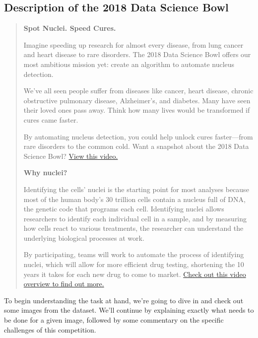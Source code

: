 \documentclass[paper=letter, fontsize=12pt]{article}
\numberwithin{equation}{section} %
\numberwithin{figure}{section} %
\numberwithin{table}{section} %
\begin{document}
\begin{appendixatend}
    \subsection{Description of the 2018 Data Science
    Bowl}\label{app:competition-description}
    \begin{quote}
        \textbf{\large Spot Nuclei. Speed Cures.}

        Imagine speeding up research for almost every disease, from lung
        cancer and heart disease to rare disorders. The 2018 Data Science
        Bowl offers our most ambitious mission yet: create an algorithm to
        automate nucleus detection.

        We've all seen people suffer from diseases like cancer, heart
        disease, chronic obstructive pulmonary disease, Alzheimer's, and
        diabetes. Many have seen their loved ones pass away. Think how many
        lives would be transformed if cures came faster.

        By automating nucleus detection, you could help unlock cures
        faster—from rare disorders to the common cold. Want a snapshot
        about the 2018 Data Science Bowl?
        \href{https://www.youtube.com/watch?v=eHwkfhmJexs}{View this
        video.}

        \textbf{\large Why nuclei?}

        Identifying the cells' nuclei is the starting point for most
        analyses because most of the human body's 30 trillion cells contain
        a nucleus full of DNA, the genetic code that programs each cell.
        Identifying nuclei allows researchers to identify each individual
        cell in a sample, and by measuring how cells react to various
        treatments, the researcher can understand the underlying biological
        processes at work.

        By participating, teams will work to automate the process of
        identifying nuclei, which will allow for more efficient drug
        testing, shortening the 10 years it takes for each new drug to come
        to market.
        \href{https://datasciencebowl.com/2018dsbtutorial/}{Check out this
        video overview to find out more.}
    \end{quote}
\end{appendixatend}

To begin understanding the task at hand, we're going to dive in and check out 
some images from the dataset.  We'll continue by explaining exactly what needs
to be done for a given image, followed by some commentary on the specific 
challenges of this competition.
\end{document}
